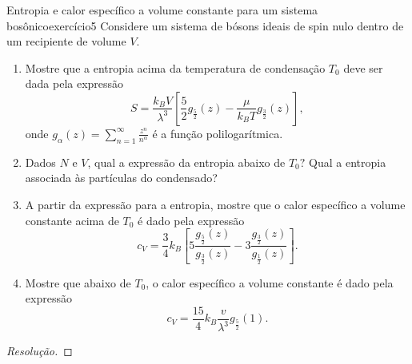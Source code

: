 \begin{exercício}{Entropia e calor específico a volume constante para um sistema bosônico}{exercício5}
    Considere um sistema de bósons ideais de spin nulo dentro de um recipiente de volume \(V\).
    \begin{enumerate}[label=(\alph*)]
        \item Mostre que a entropia acima da temperatura de condensação \(T_0\) deve ser dada pela expressão
            \begin{equation*}
                S = \frac{k_BV}{\lambda^3}\left[\frac52 g_{\frac52}(z) - \frac{\mu}{k_B T}g_{\frac32}(z)\right],
            \end{equation*}
            onde \(g_{\alpha}(z) = \sum_{n = 1}^\infty \frac{z^n}{n^\alpha}\) é a função polilogarítmica.
        \item Dados \(N\) e \(V\), qual a expressão da entropia abaixo de \(T_0?\) Qual a entropia associada às partículas do condensado?
        \item A partir da expressão para a entropia, mostre que o calor específico a volume constante acima de \(T_0\) é dado pela expressão
            \begin{equation*}
                c_V = \frac{3}{4} k_B \left[5 \frac{g_{\frac52}(z)}{g_{\frac32}(z)} - 3 \frac{g_{\frac32}(z)}{g_{\frac12}(z)}\right].
            \end{equation*}
        \item Mostre que abaixo de \(T_0\), o calor específico a volume constante é dado pela expressão
            \begin{equation*}
                c_V = \frac{15}{4} k_B \frac{v}{\lambda^3}g_{\frac52}(1).
            \end{equation*}
    \end{enumerate}
\end{exercício}
\begin{proof}[Resolução]

\end{proof}
